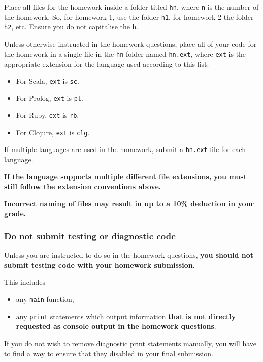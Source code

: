 \documentclass[11pt]{article}
\begin{document}
Place all files for the homework
inside a folder titled \texttt{hn}, where \texttt{n} is the number of the homework.
So, for homework 1, use the folder \texttt{h1}, for homework 2 the folder \texttt{h2}, etc.
Ensure you do not capitalise the \texttt{h}.

Unless otherwise instructed in the homework questions,
place all of your code for the homework
in a single file in the \texttt{hn} folder named \texttt{hn.ext},
where \texttt{ext} is the appropriate extension for the language used
according to this list:
\begin{itemize}
\item For Scala, \texttt{ext} is \texttt{sc}.
\item For Prolog, \texttt{ext} is \texttt{pl}.
\item For Ruby, \texttt{ext} is \texttt{rb}.
\item For Clojure, \texttt{ext} is \texttt{clg}.
\end{itemize}
If multiple languages are used in the homework,
submit a \texttt{hn.ext} file for each language.

\begin{center}
\textbf{If the language supports multiple different file extensions,}
\textbf{you must still follow the extension conventions above.}
\end{center}

\begin{center}
\textbf{Incorrect naming of files may result in up to a 10\% deduction in your grade.}
\end{center}

\subsubsection*{Do not submit testing or diagnostic code}
\label{sec:org5c52965}

Unless you are instructed to do so in the homework questions,
\textbf{you should not submit testing code with your homework submission}.

This includes
\begin{itemize}
\item any \texttt{main} function,
\item any \texttt{print} statements which output information
\textbf{that is not directly requested as console output}
\textbf{in the homework questions}.
\end{itemize}

If you do not wish to remove diagnostic print statements manually,
you will have to find a way to ensure that they disabled
in your final submission.
\end{document}
